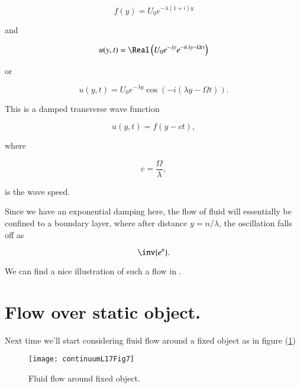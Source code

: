 \begin{equation}\label{eqn:continuumL17:540}
f(y) = U_0 e^{-\lambda (1 + i) y}
\end{equation}

and

\begin{equation}\label{eqn:continuumL17:560}
u(y, t) = 
\Real\left(
U_0 e^{-\lambda y} e^{ -i (\lambda y - \Omega t) }
\right)
\end{equation}

or

\begin{equation}\label{eqn:continuumL17:580}
u(y, t) = 
U_0 e^{-\lambda y} \cos\left( -i (\lambda y - \Omega t) \right).
\end{equation}

This is a damped transverse wave function

\begin{equation}\label{eqn:continuumL17:600}
u(y, t) = f(y - c t),
\end{equation}

where 

\begin{equation}\label{eqn:continuumL17:620}
c = \frac{\Omega}{\lambda},
\end{equation}

is the wave speed.

Since we have an exponential damping here, the flow of fluid will essentially be confined to a boundary layer, where after distance $y = n/\lambda$, the oscillation falls off as

\begin{equation}\label{eqn:continuumL17:640}
\inv{e^n}.
\end{equation}

We can find a nice illustration of such a flow in \cite{wiki:StokesBoundary}.

\section{Flow over static object.}

Next time we'll start considering fluid flow around a fixed object as in figure (\ref{fig:continuumL17:continuumL17Fig7})

\begin{figure}[htp]
   \centering
   \texttt{[image: continuumL17Fig7]}
   \caption{Fluid flow around fixed object.}\label{fig:continuumL17:continuumL17Fig7}
\end{figure}


\EndArticle
